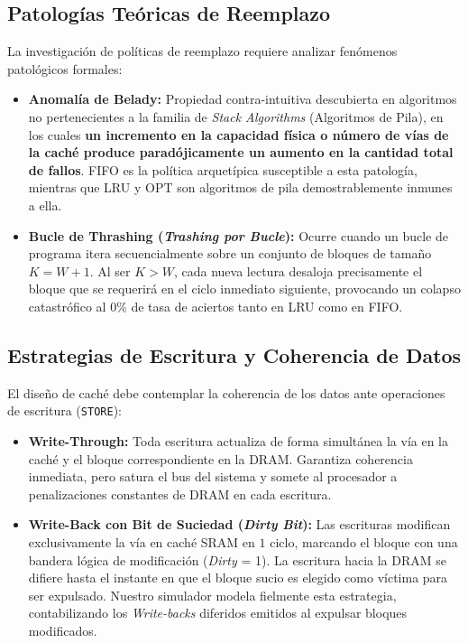 \documentclass[11pt,letterpaper]{article}
\begin{document}
\subsection{Patologías Teóricas de Reemplazo}
La investigación de políticas de reemplazo requiere analizar fenómenos patológicos formales:
\begin{itemize}
    \item \textbf{Anomalía de Belady:} Propiedad contra-intuitiva descubierta en algoritmos no pertenecientes a la familia de \textit{Stack Algorithms} (Algoritmos de Pila), en los cuales \textbf{un incremento en la capacidad física o número de vías de la caché produce paradójicamente un aumento en la cantidad total de fallos}. FIFO es la política arquetípica susceptible a esta patología, mientras que LRU y OPT son algoritmos de pila demostrablemente inmunes a ella.
    \item \textbf{Bucle de Thrashing (\textit{Trashing por Bucle}):} Ocurre cuando un bucle de programa itera secuencialmente sobre un conjunto de bloques de tamaño $K = W + 1$. Al ser $K > W$, cada nueva lectura desaloja precisamente el bloque que se requerirá en el ciclo inmediato siguiente, provocando un colapso catastrófico al $0\%$ de tasa de aciertos tanto en LRU como en FIFO.
\end{itemize}

\subsection{Estrategias de Escritura y Coherencia de Datos}
El diseño de caché debe contemplar la coherencia de los datos ante operaciones de escritura (\texttt{STORE}):
\begin{itemize}
    \item \textbf{Write-Through:} Toda escritura actualiza de forma simultánea la vía en la caché y el bloque correspondiente en la DRAM. Garantiza coherencia inmediata, pero satura el bus del sistema y somete al procesador a penalizaciones constantes de DRAM en cada escritura.
    \item \textbf{Write-Back con Bit de Suciedad (\textit{Dirty Bit}):} Las escrituras modifican exclusivamente la vía en caché SRAM en $1$ ciclo, marcando el bloque con una bandera lógica de modificación (\textit{Dirty} = 1). La escritura hacia la DRAM se difiere hasta el instante en que el bloque sucio es elegido como víctima para ser expulsado. Nuestro simulador modela fielmente esta estrategia, contabilizando los \textit{Write-backs} diferidos emitidos al expulsar bloques modificados.
\end{itemize}
\end{document}
